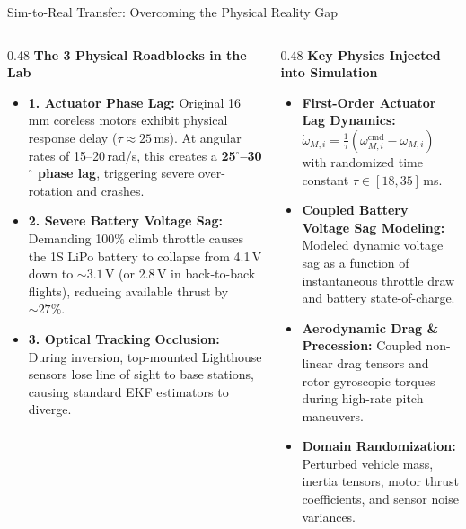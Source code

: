\documentclass[aspectratio=169,9pt]{beamer}
\begin{document}
\begin{frame}{Sim-to-Real Transfer: Overcoming the Physical Reality Gap}
  \begin{columns}[onlytextwidth,T]
    \begin{column}{0.48\textwidth}
      \textbf{The 3 Physical Roadblocks in the Lab}
      \begin{itemize}\itemsep3pt
        \item \textbf{1. Actuator Phase Lag:}
        Original 16\,mm coreless motors exhibit physical response delay ($\tau \approx 25$\,ms). At angular rates of 15--20\,rad/s, this creates a \textbf{25$^\circ$--30$^\circ$ phase lag}, triggering severe over-rotation and crashes.
        \item \textbf{2. Severe Battery Voltage Sag:}
        Demanding 100\% climb throttle causes the 1S LiPo battery to collapse from 4.1\,V down to $\sim 3.1$\,V (or 2.8\,V in back-to-back flights), reducing available thrust by $\sim 27\%$.
        \item \textbf{3. Optical Tracking Occlusion:}
        During inversion, top-mounted Lighthouse sensors lose line of sight to base stations, causing standard EKF estimators to diverge.
      \end{itemize}
    \end{column}
    
    \begin{column}{0.48\textwidth}
      \textbf{Key Physics Injected into Simulation}
      \begin{itemize}\itemsep3pt
        \item \textbf{First-Order Actuator Lag Dynamics:}
        $\dot{\omega}_{M,i} = \frac{1}{\tau} (\omega_{M,i}^{\text{cmd}} - \omega_{M,i})$ with randomized time constant $\tau \in [18, 35]$\,ms.
        \item \textbf{Coupled Battery Voltage Sag Modeling:}
        Modeled dynamic voltage sag as a function of instantaneous throttle draw and battery state-of-charge.
        \item \textbf{Aerodynamic Drag \& Precession:}
        Coupled non-linear drag tensors and rotor gyroscopic torques during high-rate pitch maneuvers.
        \item \textbf{Domain Randomization:}
        Perturbed vehicle mass, inertia tensors, motor thrust coefficients, and sensor noise variances.
      \end{itemize}
    \end{column}
  \end{columns}
\end{frame}
\end{document}
